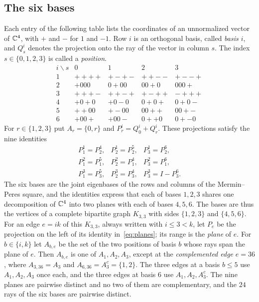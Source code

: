 \subsection{The six bases}\label{sec:square}

Each entry of the following table lists the coordinates of an unnormalized vector of $\mathbb C^4$, with $+$ and $-$ for $1$ and $-1$. Row $i$ is an orthogonal basis, called \emph{basis $i$}, and $Q^i_s$ denotes the projection onto the ray of the vector in column $s$. The index $s\in\{0,1,2,3\}$ is called a \emph{position}.
\[
\begin{array}{c|cccc}
 i\backslash s&0&1&2&3\\ \hline
 1& ++++ & +-+- & ++-- & +--+\\
 2& +000 & 0+00 & 00+0 & 000+\\
 3& +++- & ++-+ & +-++ & -+++\\
 4& +0+0 & +0-0 & 0+0+ & 0+0-\\
 5& ++00 & +-00 & 00++ & 00+-\\
 6& +00+ & +00- & 0++0 & 0+-0
\end{array}
\]
For $r\in\{1,2,3\}$ put $A_r=\{0,r\}$ and $P^i_r=Q^i_0+Q^i_r$. These projections satisfy the nine identities
\begin{equation}\label{eq:planes}
\begin{array}{ccc}
 P^1_1=P^4_2,&P^1_2=P^5_2,&P^1_3=P^6_2,\\
 P^2_1=P^5_1,&P^2_2=P^4_1,&P^2_3=P^6_1,\\
 P^3_1=P^5_3,&P^3_2=P^4_3,&P^3_3=I-P^6_3 .
\end{array}
\end{equation}
The six bases are the joint eigenbases of the rows and columns of the Mermin--Peres square, and the identities express that each of bases $1,2,3$ shares one decomposition of $\mathbb C^4$ into two planes with each of bases $4,5,6$. The bases are thus the vertices of a complete bipartite graph $K_{3,3}$ with sides $\{1,2,3\}$ and $\{4,5,6\}$. For an edge $e=ik$ of this $K_{3,3}$, always written with $i\le3<k$, let $P_e$ be the projection on the left of its identity in~\eqref{eq:planes}; its range is the \emph{plane} of $e$. For $b\in\{i,k\}$ let $A_{b,e}$ be the set of the two positions of basis $b$ whose rays span the plane of $e$. Then $A_{b,e}$ is one of $A_1,A_2,A_3$, except at the \emph{complemented edge} $e=36$, where $A_{3,36}=A_3$ and $A_{6,36}=A_3^c=\{1,2\}$. The three edges at a basis $b\le5$ use $A_1,A_2,A_3$ once each, and the three edges at basis $6$ use $A_1,A_2,A_3^c$. The nine planes are pairwise distinct and no two of them are complementary, and the $24$ rays of the six bases are pairwise distinct.


